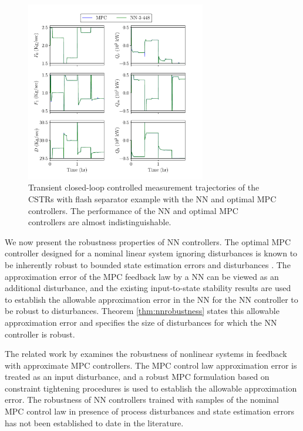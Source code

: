 \documentclass[preprint,5p, twocolumn, authoryear]{elsarticle}
\begin{document}
\begin{figure}[!h]
    \centering
	\includegraphics[page=2, width=0.7\textwidth,
		height=0.5\textheight]{cstrs_comparision_plots.pdf} \caption{Transient
		closed-loop controlled measurement trajectories of the CSTRs with flash
		separator example with the NN and optimal MPC controllers. The
		performance of the NN and optimal MPC controllers are almost
		indistinguishable.}
		\label{fig:cl_cstrs_outputs}
\end{figure}

We now present the robustness properties of NN controllers. The optimal MPC
controller designed for a nominal linear system ignoring disturbances is known
to be inherently robust to bounded state estimation errors and disturbances
\citep*{heath:wills:2005, pannocchia:rawlings:wright:2011}. The approximation
error of the MPC feedback law by a NN can be viewed as an additional
disturbance, and the existing input-to-state stability results
\citep*{sontag:wang:1995} are used to establish the allowable approximation
error in the NN for the NN controller to be robust to disturbances. Theorem
\ref{thm:nnrobustness} states this allowable approximation error and specifies
the size of disturbances for which the NN controller is robust.

The related work by \cite{hertneck:kohler:trimpe:allgower:2018} examines the
robustness of nonlinear systems in feedback with approximate MPC controllers.
The MPC control law approximation error is treated as an input disturbance, and
a robust MPC formulation based on constraint tightening procedures is used to
establish the allowable approximation error. The robustness of NN controllers
trained with samples of the nominal MPC control law in presence of process
disturbances and state estimation errors has not been established to date in the
literature. 
\end{document}
